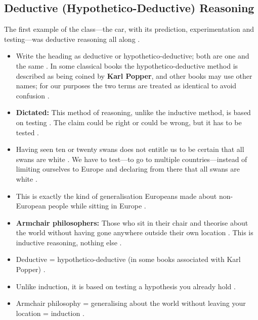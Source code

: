 \subsection{Deductive (Hypothetico-Deductive) Reasoning}
The first example of the class---the car, with its prediction, experimentation and testing---was deductive reasoning all along .
\begin{itemize}
    \item Write the heading as deductive or hypothetico-deductive; both are one and the same . In some classical books the hypothetico-deductive method is described as being coined by \textbf{Karl Popper}, and other books may use other names; for our purposes the two terms are treated as identical to avoid confusion .
    \item \textbf{Dictated:} This method of reasoning, unlike the inductive method, is based on testing . The claim could be right or could be wrong, but it has to be tested .
    \item Having seen ten or twenty swans does not entitle us to be certain that all swans are white . We have to test---to go to multiple countries---instead of limiting ourselves to Europe and declaring from there that all swans are white .
\end{itemize}

\begin{CriticalPoint}
\begin{itemize}
    \item This is exactly the kind of generalisation Europeans made about non-European people while sitting in Europe .
    \item \textbf{Armchair philosophers:} Those who sit in their chair and theorise about the world without having gone anywhere outside their own location . This is inductive reasoning, nothing else .
\end{itemize}
\end{CriticalPoint}

\begin{QuickRevision}
\begin{itemize}
    \item Deductive = hypothetico-deductive (in some books associated with Karl Popper) .
    \item Unlike induction, it is based on testing a hypothesis you already hold .
    \item Armchair philosophy = generalising about the world without leaving your location = induction .
\end{itemize}
\end{QuickRevision}

